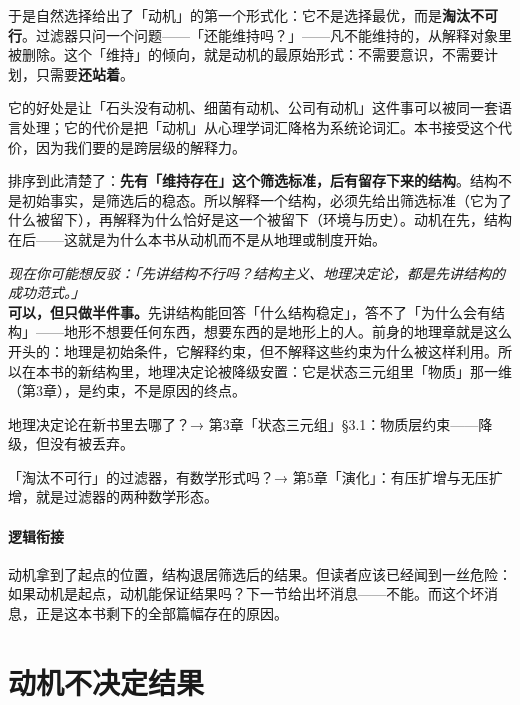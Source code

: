 \documentclass[../../main2.tex]{subfiles}
\begin{document}
	于是自然选择给出了「动机」的第一个形式化：它不是选择最优，而是\textbf{淘汰不可行}。过滤器只问一个问题——「还能维持吗？」——凡不能维持的，从解释对象里被删除。这个「维持」的倾向，就是动机的最原始形式：不需要意识，不需要计划，只需要\textbf{还站着}。

	它的好处是让「石头没有动机、细菌有动机、公司有动机」这件事可以被同一套语言处理；它的代价是把「动机」从心理学词汇降格为系统论词汇。本书接受这个代价，因为我们要的是跨层级的解释力。

	排序到此清楚了：\textbf{先有「维持存在」这个筛选标准，后有留存下来的结构}。结构不是初始事实，是筛选后的稳态。所以解释一个结构，必须先给出筛选标准（它为了什么被留下），再解释为什么恰好是这一个被留下（环境与历史）。动机在先，结构在后——这就是为什么本书从动机而不是从地理或制度开始。

	\begin{questionbox}
		\textit{现在你可能想反驳：「先讲结构不行吗？结构主义、地理决定论，都是先讲结构的成功范式。」}\\
		\textbf{可以，但只做半件事。}先讲结构能回答「什么结构稳定」，答不了「为什么会有结构」——地形不想要任何东西，想要东西的是地形上的人。前身的地理章就是这么开头的：地理是初始条件，它解释约束，但不解释这些约束为什么被这样利用。所以在本书的新结构里，地理决定论被降级安置：它是状态三元组里「物质」那一维（第3章），是约束，不是原因的终点。
	\end{questionbox}

	\begin{reader_anticipation}
		\item 地理决定论在新书里去哪了？→ 第3章「状态三元组」§3.1：物质层约束——降级，但没有被丢弃。
		\item 「淘汰不可行」的过滤器，有数学形式吗？→ 第5章「演化」：有压扩增与无压扩增，就是过滤器的两种数学形态。
	\end{reader_anticipation}

	\paragraph*{逻辑衔接}
	动机拿到了起点的位置，结构退居筛选后的结果。但读者应该已经闻到一丝危险：如果动机是起点，动机能保证结果吗？下一节给出坏消息——不能。而这个坏消息，正是这本书剩下的全部篇幅存在的原因。

	\section{动机不决定结果}
	\label{sec:mot-result}
\end{document}
